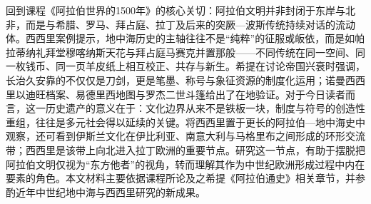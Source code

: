 \documentclass[UTF8,a4paper,12pt]{ctexart}
\begin{document}
回到课程《阿拉伯世界的1500年》的核心关切：阿拉伯文明并非封闭于东岸与北非，而是与希腊、罗马、拜占庭、拉丁及后来的突厥—波斯传统持续对话的流动体。西西里案例提示，地中海历史的主轴往往不是``纯粹''的征服或皈依，而是如帕拉蒂纳礼拜堂穆喀纳斯天花与拜占庭马赛克并置那般——不同传统在同一空间、同一枚钱币、同一页羊皮纸上相互校正、共存与新生。希提在讨论帝国兴衰时强调，长治久安靠的不仅仅是刀剑，更是笔墨、称号与象征资源的制度化运用\cite{hitip1958}；诺曼西西里以迪旺档案、易德里西地图与罗杰二世斗篷给出了在地验证。对于今日读者而言，这一历史遗产的意义在于：文化边界从来不是铁板一块，制度与符号的创造性重组，往往是多元社会得以延续的关键。将西西里置于更长的阿拉伯—地中海史中观察，还可看到伊斯兰文化在伊比利亚、南意大利与马格里布之间形成的环形交流带；西西里是该带上向北进入拉丁欧洲的重要节点。研究这一节点，有助于摆脱把阿拉伯文明仅视为``东方他者''的视角，转而理解其作为中世纪欧洲形成过程中内在要素的角色。本文材料主要依据课程所论及之希提《阿拉伯通史》相关章节，并参酌近年中世纪地中海与西西里研究的新成果\cite{hitip1958,alshaar2026}。
\end{document}
